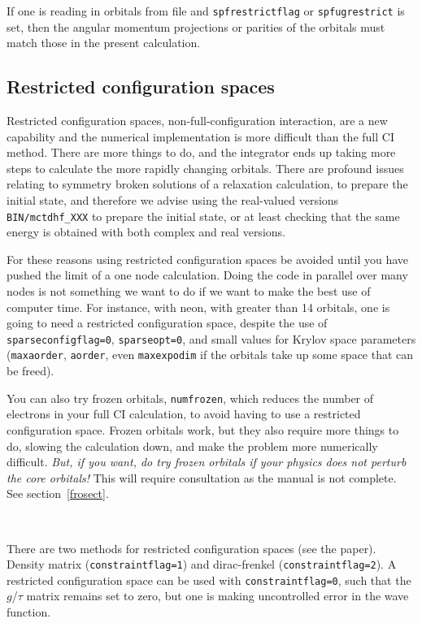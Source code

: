 \documentclass[10pt,leqno, oneside]{book}
\begin{document}
If one is reading in orbitals from file and \verb#spfrestrictflag# or \verb#spfugrestrict# is set, then the angular momentum projections or parities of the
orbitals must match those in the present calculation.

\subsection{Restricted configuration spaces}

Restricted configuration spaces, non-full-configuration interaction,
are a new capability and the numerical implementation is more difficult than the full CI method.  There are more things to do, and the integrator
ends up taking more steps to calculate the more rapidly changing orbitals.  There are profound issues relating to symmetry broken solutions of 
a relaxation calculation, to prepare the initial state, and therefore we advise using the real-valued versions \verb#BIN/mctdhf_XXX# to prepare the
initial state, or at least checking that the same energy is obtained with both complex and real versions.

For these reasons using restricted configuration spaces
be avoided until you have pushed the limit of a one node calculation.  Doing the code in parallel over many nodes is not something we want
to do if we want to make the best use of computer time.
For instance, with neon, with greater than 14 orbitals, one is going to need
a restricted configuration space, despite the use of \verb#sparseconfigflag=0#, \verb#sparseopt=0#, and small values for Krylov space parameters
(\verb#maxaorder#, \verb#aorder#, even \verb#maxexpodim# if the orbitals take up some space that can be freed).

You can also try frozen orbitals, \verb#numfrozen#, which reduces the number of electrons in your full CI calculation,
to avoid having to use a restricted configuration space.
 Frozen orbitals work, but they also require more things to do, slowing the calculation down,
and make the problem more numerically difficult.  \textit{But, if you want, do try frozen orbitals if your physics does not perturb the core orbitals! } 
This will require consultation as the manual is not complete.  See section~\ref{frosect}.

\

There are two methods for restricted configuration spaces (see the paper).  Density matrix (\verb#constraintflag=1#) and dirac-frenkel (\verb#constraintflag=2#).
A restricted configuration space can be used with \verb#constraintflag=0#, such that the $g$/$\tau$ matrix remains set to zero, 
but one is making uncontrolled error in the wave function.
\end{document}
